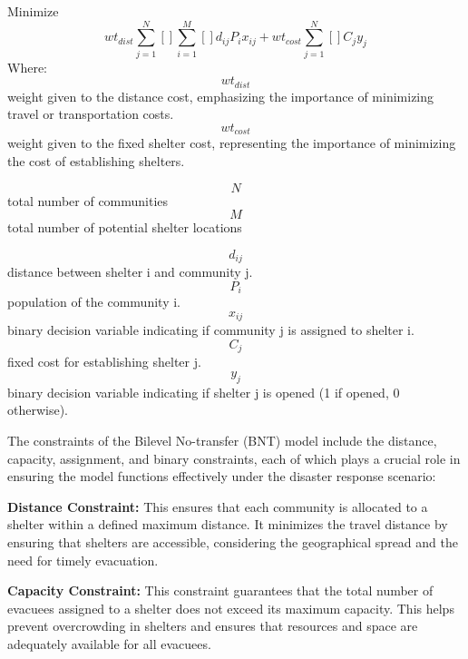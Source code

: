 Minimize \begin{equation} wt_{dist}\sum_{j=1}^{N}\left[  \right]\sum_{i=1}^{M}\left[  \right]d_{ij}P_{i}x_{ij}+wt_{cost}\sum_{j=1}^{N}\left[  \right]C_{j}y_{j} \end{equation}
Where:
\begin{equation}wt_{dist} \end{equation}weight given to the distance cost, emphasizing the importance of minimizing travel or transportation costs.
\begin{equation}wt_{cost}\end{equation}weight given to the fixed shelter cost, representing the importance of minimizing the cost of establishing shelters.

\begin{equation}N\end{equation} total number of communities
\begin{equation}M\end{equation} total number of potential shelter locations

\begin{equation}d_{ij}\end{equation}
distance between shelter i and community j.
\begin{equation}P_{i}\end{equation}
population of the community i.
\begin{equation}x_{ij}\end{equation}binary decision variable indicating if community j is assigned to shelter i.
\begin{equation}C_{j}\end{equation}fixed cost for establishing shelter j.
\begin{equation}y_{j}\end{equation}binary decision variable indicating if shelter j is opened (1 if opened, 0 otherwise).

The constraints of the Bilevel No-transfer (BNT) model include the distance, capacity, assignment, and binary constraints, each of which plays a crucial role in ensuring the model functions effectively under the disaster response scenario:

\textbf{Distance Constraint:} This ensures that each community is allocated to a shelter within a defined maximum distance. It minimizes the travel distance by ensuring that shelters are accessible, considering the geographical spread and the need for timely evacuation.

\textbf{Capacity Constraint: }This constraint guarantees that the total number of evacuees assigned to a shelter does not exceed its maximum capacity. This helps prevent overcrowding in shelters and ensures that resources and space are adequately available for all evacuees.

